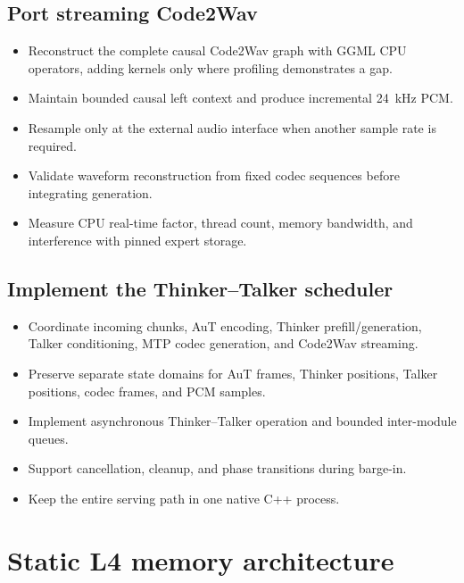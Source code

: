 \documentclass[10pt,letterpaper]{article}
\begin{document}
\subsection{Port streaming Code2Wav}
\begin{itemize}
    \item Reconstruct the complete causal Code2Wav graph with GGML CPU operators, adding kernels only where profiling demonstrates a gap.
    \item Maintain bounded causal left context and produce incremental 24~kHz PCM.
    \item Resample only at the external audio interface when another sample rate is required.
    \item Validate waveform reconstruction from fixed codec sequences before integrating generation.
    \item Measure CPU real-time factor, thread count, memory bandwidth, and interference with pinned expert storage.
\end{itemize}

\subsection{Implement the Thinker--Talker scheduler}
\begin{itemize}
    \item Coordinate incoming chunks, AuT encoding, Thinker prefill/generation, Talker conditioning, MTP codec generation, and Code2Wav streaming.
    \item Preserve separate state domains for AuT frames, Thinker positions, Talker positions, codec frames, and PCM samples.
    \item Implement asynchronous Thinker--Talker operation and bounded inter-module queues.
    \item Support cancellation, cleanup, and phase transitions during barge-in.
    \item Keep the entire serving path in one native C++ process.
\end{itemize}

\section{Static L4 memory architecture}
\end{document}
